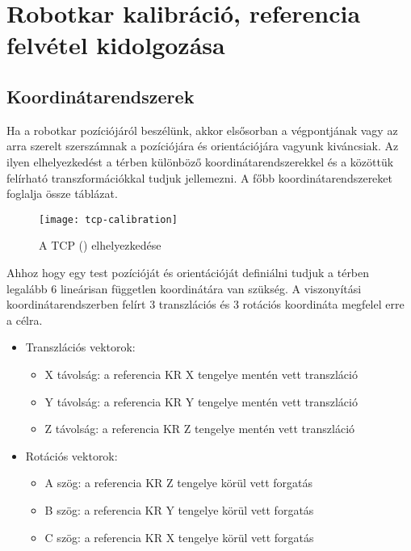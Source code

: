\documentclass[../documentation.tex]{subfiles}
\begin{document}
\section{Robotkar kalibráció, referencia felvétel kidolgozása}
\subsection{Koordinátarendszerek}
Ha a robotkar pozíciójáról beszélünk, akkor elsősorban a végpontjának vagy az arra szerelt szerszámnak a pozíciójára és orientációjára vagyunk kiváncsiak. Az ilyen elhelyezkedést a térben különböző koordinátarendszerekkel és a közöttük felírható transzformációkkal tudjuk jellemezni. A főbb koordinátarendszereket foglalja össze  táblázat.



\begin{figure}[h]
	\centering
	\texttt{[image: tcp-calibration]}
	\caption{A TCP () elhelyezkedése\cite{sunrisemanual}}
	\label{fig:tcp-calibration}
\end{figure}

Ahhoz hogy egy test pozícióját és orientációját definiálni tudjuk a térben legalább 6 lineárisan független koordinátára van szükség. A viszonyítási koordinátarendszerben felírt 3 transzlációs és 3 rotációs koordináta megfelel erre a célra.
\begin{itemize}
	\item Transzlációs vektorok:
	\begin{itemize}
		\item X távolság: a referencia KR X tengelye mentén vett transzláció
		\item Y távolság: a referencia KR Y tengelye mentén vett transzláció
		\item Z távolság: a referencia KR Z tengelye mentén vett transzláció
	\end{itemize}
	\item Rotációs vektorok:
	\begin{itemize}
		\item A szög: a referencia KR Z tengelye körül vett forgatás
		\item B szög: a referencia KR Y tengelye körül vett forgatás
		\item C szög: a referencia KR X tengelye körül vett forgatás
	\end{itemize}
\end{itemize}
\end{document}
